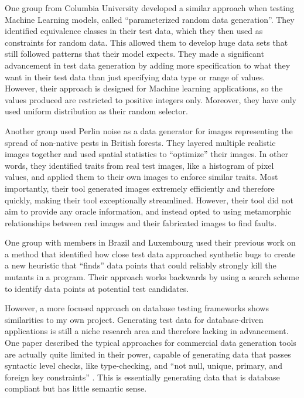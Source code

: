 One group from Columbia University developed a similar approach when testing Machine Learning models, called ``parameterized random data generation''. They identified equivalence classes in their test data, which they then used as constraints for random data. This allowed them to develop huge data sets that still followed patterns that their model expects. They made a significant advancement in test data generation by adding more specification to what they want in their test data than just specifying data type or range of values. However, their approach is designed for Machine learning applications, so the values produced are restricted to positive integers only. Moreover, they have only used uniform distribution as their random selector.

Another group used Perlin noise as a data generator for images representing the spread of non-native pests in British forests. They layered multiple realistic images together and used spatial statistics to ``optimize'' their images. In other words, they identified traits from real test images, like a histogram of pixel values, and applied them to their own images to enforce similar traits. Most importantly, their tool generated images extremely efficiently and therefore quickly, making their tool exceptionally streamlined. However, their tool did not aim to provide any oracle information, and instead opted to using metamorphic relationships between real images and their fabricated images to find faults.

One group with members in Brazil and Luxembourg used their previous work on a method that identified how close test data approached synthetic bugs to create a new heuristic that ``finds'' data points that could reliably strongly kill the mutants in a program. Their approach works backwards by using a search scheme to identify data points at potential test candidates.

However, a more focused approach on database testing frameworks shows similarities to my own project. Generating test data for database-driven applications is still a niche research area and therefore lacking in advancement. One paper described the typical approaches for commercial data generation tools are actually quite limited in their power, capable of generating data that passes syntactic level checks, like type-checking, and ``not null, unique, primary, and foreign key constraints'' . This is essentially generating data that is database compliant but has little semantic sense.
